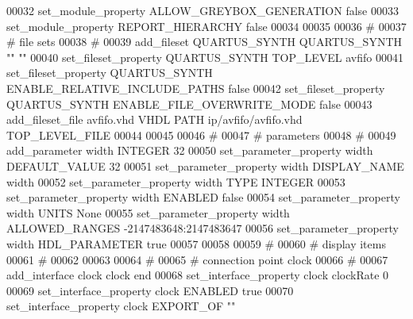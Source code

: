\begin{DoxyCode}
00032 \textcolor{comment}{}set\_module\_property ALLOW\_GREYBOX\_GENERATION false\textcolor{comment}{}
00033 \textcolor{comment}{}set\_module\_property REPORT\_HIERARCHY false\textcolor{comment}{}
00034 \textcolor{comment}{}
00035 
00036 \textcolor{comment}{# }
00037 \textcolor{comment}{}\textcolor{comment}{# file sets}
00038 \textcolor{comment}{}\textcolor{comment}{# }
00039 \textcolor{comment}{}add\_fileset QUARTUS\_SYNTH QUARTUS\_SYNTH "" ""\textcolor{comment}{}
00040 \textcolor{comment}{}set\_fileset\_property QUARTUS\_SYNTH TOP\_LEVEL avfifo\textcolor{comment}{}
00041 \textcolor{comment}{}set\_fileset\_property QUARTUS\_SYNTH ENABLE\_RELATIVE\_INCLUDE\_PATHS false\textcolor{comment}{}
00042 \textcolor{comment}{}set\_fileset\_property QUARTUS\_SYNTH ENABLE\_FILE\_OVERWRITE\_MODE false\textcolor{comment}{}
00043 \textcolor{comment}{}add\_fileset\_file avfifo.vhd VHDL PATH ip/avfifo/avfifo.vhd TOP\_LEVEL\_FILE\textcolor{comment}{}
00044 \textcolor{comment}{}
00045 
00046 \textcolor{comment}{# }
00047 \textcolor{comment}{}\textcolor{comment}{# parameters}
00048 \textcolor{comment}{}\textcolor{comment}{# }
00049 \textcolor{comment}{}add\_parameter width INTEGER 32\textcolor{comment}{}
00050 \textcolor{comment}{}set\_parameter\_property width DEFAULT\_VALUE 32\textcolor{comment}{}
00051 \textcolor{comment}{}set\_parameter\_property width DISPLAY\_NAME width\textcolor{comment}{}
00052 \textcolor{comment}{}set\_parameter\_property width TYPE INTEGER\textcolor{comment}{}
00053 \textcolor{comment}{}set\_parameter\_property width ENABLED false\textcolor{comment}{}
00054 \textcolor{comment}{}set\_parameter\_property width UNITS None\textcolor{comment}{}
00055 \textcolor{comment}{}set\_parameter\_property width ALLOWED\_RANGES -2147483648:2147483647\textcolor{comment}{}
00056 \textcolor{comment}{}set\_parameter\_property width HDL\_PARAMETER true\textcolor{comment}{}
00057 \textcolor{comment}{}
00058 
00059 \textcolor{comment}{# }
00060 \textcolor{comment}{}\textcolor{comment}{# display items}
00061 \textcolor{comment}{}\textcolor{comment}{# }
00062 \textcolor{comment}{}
00063 
00064 \textcolor{comment}{# }
00065 \textcolor{comment}{}\textcolor{comment}{# connection point clock}
00066 \textcolor{comment}{}\textcolor{comment}{# }
00067 \textcolor{comment}{}add\_interface clock clock end\textcolor{comment}{}
00068 \textcolor{comment}{}set\_interface\_property clock clockRate 0\textcolor{comment}{}
00069 \textcolor{comment}{}set\_interface\_property clock ENABLED true\textcolor{comment}{}
00070 \textcolor{comment}{}set\_interface\_property clock EXPORT\_OF ""\textcolor{comment}{}

\end{DoxyCode}
